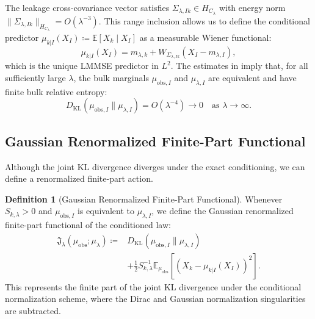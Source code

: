 \documentclass[11pt]{amsart}
\theoremstyle{plain}
\theoremstyle{definition}
\newtheorem{definition}[theorem]{Definition}
\theoremstyle{remark}
\newcommand{\KL}{D_{\operatorname{KL}}}
\newcommand{\E}{\mathbb{E}}
\begin{document}
    The leakage cross-covariance vector satisfies $\Sigma_{\lambda,Ik} \in H_{C_\lambda}$ with energy norm $\|\Sigma_{\lambda,Ik}\|_{H_{C_\lambda}} = O(\lambda^{-3})$. This range inclusion allows us to define the conditional predictor $\mu_{k|I}(X_I) \coloneqq \E[X_k \mid X_I]$ as a measurable Wiener functional:
    \begin{equation}
        \mu_{k|I}(X_I) = m_{\lambda,k} + W_{\Sigma_{\lambda,Ik}}(X_I - m_{\lambda,I}),
    \end{equation}
    which is the unique LMMSE predictor in $L^2$. The estimates in  imply that, for all sufficiently large $\lambda$, the bulk marginals $\mu_{\text{obs},I}$ and $\mu_{\lambda,I}$ are equivalent and have finite bulk relative entropy:
    \begin{equation}
        \KL(\mu_{\text{obs},I} \parallel \mu_{\lambda,I}) = O(\lambda^{-4}) \to 0 \quad \text{as } \lambda \to \infty.
    \end{equation}

    \subsection{Gaussian Renormalized Finite-Part Functional}
    \label{sec:gaussian:functional}

    Although the joint KL divergence diverges under the exact conditioning, we can define a renormalized finite-part action.

    \begin{definition}[Gaussian Renormalized Finite-Part Functional]
        \label{def:unified_action}
        Whenever $S_{k,\lambda}>0$ and $\mu_{\text{obs},I}$ is equivalent to $\mu_{\lambda,I}$, we define the Gaussian renormalized finite-part functional of the conditioned law:
        \begin{equation}
            \label{eq:unified_action}
            \begin{aligned}
                \mathfrak{J}_\lambda(\mu_{\mathrm{obs}}; \mu_\lambda) \coloneqq &\KL(\mu_{\mathrm{obs},I} \parallel \mu_{\lambda,I}) \\
                &+ \frac{1}{2} S_{k,\lambda}^{-1} \E_{\mu_{\mathrm{obs}}}\left[ \left( X_k - \mu_{k|I}(X_I) \right)^2 \right].
            \end{aligned}
        \end{equation}
        This represents the finite part of the joint KL divergence under the conditional normalization scheme, where the Dirac and Gaussian normalization singularities are subtracted.
    \end{definition}
\end{document}
